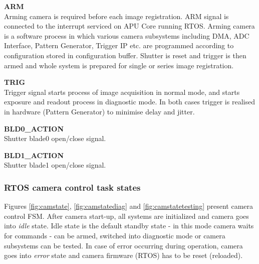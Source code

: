 \begin{description}
\item \textbf{ARM} \hfill \\
Arming camera is required before each image registration. ARM signal is connected to the interrupt serviced on APU Core running RTOS. Arming camera is a software process in which various camera subsystems including DMA, ADC Interface, Pattern Generator, Trigger IP etc. are programmed according to configuration stored in configuration buffer. Shutter is reset and trigger is then armed and whole system is prepared for single or series image registration.

\item \textbf{TRIG} \hfill \\
Trigger signal starts process of image acquisition in normal mode, and starts exposure and readout process in diagnostic mode. In both cases trigger is realised in hardware (Pattern Generator) to minimise delay and jitter.
\item \textbf{BLD0\_ACTION} \hfill \\
Shutter blade0 open/close signal.

\item \textbf{BLD1\_ACTION} \hfill \\
Shutter blade1 open/close signal.

\end{description}

\subsubsection{RTOS camera control task states}
\label{sec:control_fsm}


Figures \ref{fig:camstate}, \ref{fig:camstatediag} and \ref{fig:camstatetesting} present camera control FSM. After camera start-up, all systems are initialized and camera goes into \emph{idle} state. Idle state is the default standby state - in this mode camera waits for commands - can be armed, switched into diagnostic mode or camera subsystems can be tested. In case of error occurring during operation, camera goes into \emph{error} state and camera firmware (RTOS) has to be reset (reloaded).

